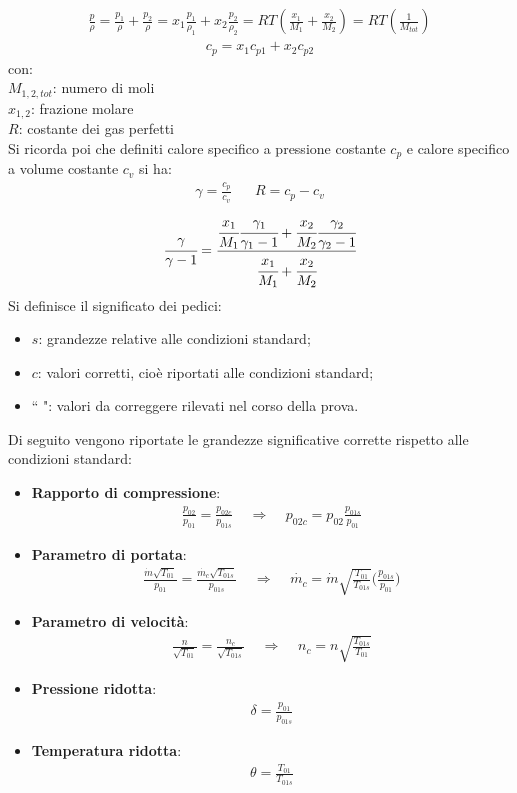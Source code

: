 \begin{align*}
\frac{p}{\rho} = \frac{p_1}{\rho} + \frac{p_2}{\rho} = x_1  \frac{p_1}{\rho_1} + x_2  \frac{p_2}{\rho_2} = RT \left( \frac{x_1}{M_1} + \frac{x_2}{M_2} \right) = RT\left(\frac{1}{M_{tot}}\right)
\end{align*}
\begin{align*}
c_p = x_1 c_{p1} + x_2 c_{p2}
\end{align*}
con:\\[1mm]
$M_{1,2,tot}$: numero di moli\\
$x_{1,2}$: frazione molare\\
$R$: costante dei gas perfetti\\[2mm]
Si ricorda poi che definiti calore specifico a pressione costante $c_p$ e calore specifico a volume costante $c_v$ si ha:
\begin{align*}
\gamma = \frac{c_p}{c_v} \;\;\;\;\;\; R = c_p - c_v
\end{align*}
\begin{align*}
\cfrac{\gamma}{\gamma -1} = \cfrac{\cfrac{x_1}{M_1} \cfrac{\gamma_1}{\gamma_1 -1}+\cfrac{x_2}{M_2} \cfrac{\gamma_2}{\gamma_2 -1}}{\cfrac{x_1}{M_1}+\cfrac{x_2}{M_2}}
\end{align*}
Si definisce il significato dei pedici:
\begin{itemize}
	\item $s$: grandezze relative alle condizioni standard;
	\item $c$: valori corretti, cioè riportati alle condizioni standard;
	\item ``  ": valori da correggere rilevati nel corso della prova.
\end{itemize}
Di seguito vengono riportate le grandezze significative corrette rispetto alle condizioni standard:
\begin{itemize}
	\item \textbf{Rapporto di compressione}:
	\begin{align*}
	\frac{p_{02}}{p_{01}} = \frac{p_{02c}}{p_{01s}} \;\;\;\; \Rightarrow \;\;\;\; p_{02c} = p_{02}\frac{p_{01s}}{p_{01}}
	\end{align*}
	\item \textbf{Parametro di portata}:
	\begin{align*}
	\frac{\dot{m}\sqrt{T_{01}}}{p_{01}}=\frac{\dot{m_c}\sqrt{T_{01s}}}{p_{01s}} \;\;\;\; \Rightarrow \;\;\;\; \dot{m_c} = \dot{m} \sqrt{\frac{T_{01}}{T_{01s}}} \bigg(\frac{p_{01s}}{p_{01}} \bigg)
	\end{align*}
	\item \textbf{Parametro di velocità}:
	\begin{align*}
	\frac{n}{\sqrt{T_{01}}}=\frac{n_c}{\sqrt{T_{01s}}} \;\;\;\; \Rightarrow \;\;\;\; n_c = n \sqrt{\frac{T_{01s}}{T_{01}}}
	\end{align*}
	\item \textbf{Pressione ridotta}:
	\begin{align*}
	\delta = \frac{p_{01}}{p_{01s}}
	\end{align*}
	\item \textbf{Temperatura ridotta}:
	\begin{align*}
	\theta = \frac{T_{01}}{T_{01s}}
	\end{align*}
\end{itemize}
